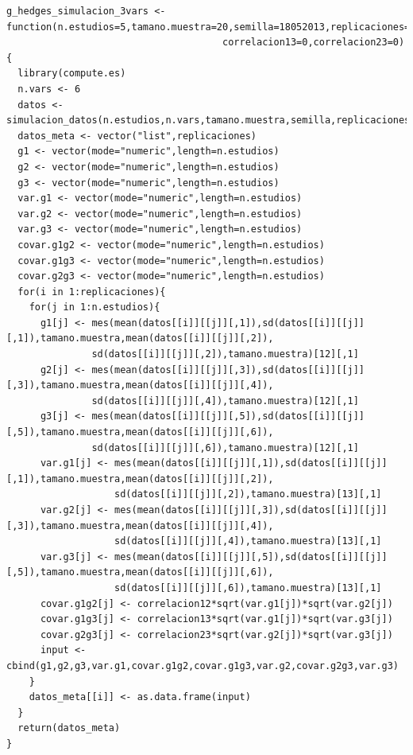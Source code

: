 \documentclass[a4paper,openright,12pt]{report}
\begin{document}
{\begin{verbatim}
g_hedges_simulacion_3vars <- function(n.estudios=5,tamano.muestra=20,semilla=18052013,replicaciones=5,correlacion12=0,
                                      correlacion13=0,correlacion23=0){
  library(compute.es)
  n.vars <- 6
  datos <- simulacion_datos(n.estudios,n.vars,tamano.muestra,semilla,replicaciones)
  datos_meta <- vector("list",replicaciones)
  g1 <- vector(mode="numeric",length=n.estudios)
  g2 <- vector(mode="numeric",length=n.estudios)
  g3 <- vector(mode="numeric",length=n.estudios)
  var.g1 <- vector(mode="numeric",length=n.estudios)
  var.g2 <- vector(mode="numeric",length=n.estudios)
  var.g3 <- vector(mode="numeric",length=n.estudios)
  covar.g1g2 <- vector(mode="numeric",length=n.estudios) 
  covar.g1g3 <- vector(mode="numeric",length=n.estudios)
  covar.g2g3 <- vector(mode="numeric",length=n.estudios)
  for(i in 1:replicaciones){
    for(j in 1:n.estudios){
      g1[j] <- mes(mean(datos[[i]][[j]][,1]),sd(datos[[i]][[j]][,1]),tamano.muestra,mean(datos[[i]][[j]][,2]),
               sd(datos[[i]][[j]][,2]),tamano.muestra)[12][,1]
      g2[j] <- mes(mean(datos[[i]][[j]][,3]),sd(datos[[i]][[j]][,3]),tamano.muestra,mean(datos[[i]][[j]][,4]),
               sd(datos[[i]][[j]][,4]),tamano.muestra)[12][,1]
      g3[j] <- mes(mean(datos[[i]][[j]][,5]),sd(datos[[i]][[j]][,5]),tamano.muestra,mean(datos[[i]][[j]][,6]),
               sd(datos[[i]][[j]][,6]),tamano.muestra)[12][,1]
      var.g1[j] <- mes(mean(datos[[i]][[j]][,1]),sd(datos[[i]][[j]][,1]),tamano.muestra,mean(datos[[i]][[j]][,2]),
                   sd(datos[[i]][[j]][,2]),tamano.muestra)[13][,1]
      var.g2[j] <- mes(mean(datos[[i]][[j]][,3]),sd(datos[[i]][[j]][,3]),tamano.muestra,mean(datos[[i]][[j]][,4]),
                   sd(datos[[i]][[j]][,4]),tamano.muestra)[13][,1]
      var.g3[j] <- mes(mean(datos[[i]][[j]][,5]),sd(datos[[i]][[j]][,5]),tamano.muestra,mean(datos[[i]][[j]][,6]),
                   sd(datos[[i]][[j]][,6]),tamano.muestra)[13][,1]
      covar.g1g2[j] <- correlacion12*sqrt(var.g1[j])*sqrt(var.g2[j])
      covar.g1g3[j] <- correlacion13*sqrt(var.g1[j])*sqrt(var.g3[j])
      covar.g2g3[j] <- correlacion23*sqrt(var.g2[j])*sqrt(var.g3[j])
      input <- cbind(g1,g2,g3,var.g1,covar.g1g2,covar.g1g3,var.g2,covar.g2g3,var.g3)
    }
    datos_meta[[i]] <- as.data.frame(input)
  }
  return(datos_meta)
}
\end{verbatim}}
\newpage
\end{document}
